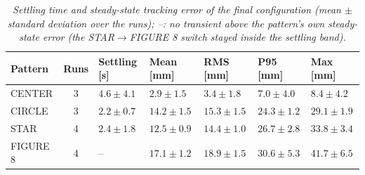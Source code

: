 \begin{table}[H]
\centering
\begin{tabularx}{\textwidth}{|l|c|X|X|X|X|X|}
\hline
\textbf{Pattern} & \textbf{Runs} & \textbf{Settling [s]} & \textbf{Mean [mm]} & \textbf{RMS [mm]} & \textbf{P95 [mm]} & \textbf{Max [mm]} \\ \hline
CENTER & 3 & $4.6 \pm 4.1$ & $2.9 \pm 1.5$ & $3.4 \pm 1.8$ & $7.0 \pm 4.0$ & $8.4 \pm 4.2$ \\ \hline
CIRCLE & 3 & $2.2 \pm 0.7$ & $14.2 \pm 1.5$ & $15.3 \pm 1.5$ & $24.3 \pm 1.2$ & $29.1 \pm 1.9$ \\ \hline
STAR & 4 & $2.4 \pm 1.8$ & $12.5 \pm 0.9$ & $14.4 \pm 1.0$ & $26.7 \pm 2.8$ & $33.8 \pm 3.4$ \\ \hline
FIGURE 8 & 4 & -- & $17.1 \pm 1.2$ & $18.9 \pm 1.5$ & $30.6 \pm 5.3$ & $41.7 \pm 6.5$ \\ \hline
\end{tabularx}
\caption{\textit{Settling time and steady-state tracking error of the final configuration (mean $\pm$ standard deviation over the runs); --: no transient above the pattern's own steady-state error (the STAR$\to$FIGURE 8 switch stayed inside the settling band).}}
\label{tab:tracking_error}
\end{table}
